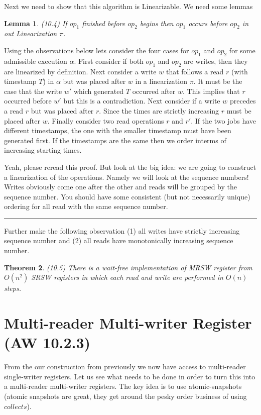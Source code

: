 \documentclass[twoside]{article}
\newcounter{lecnum}
\newtheorem{theorem}{Theorem}[lecnum]
\newtheorem{lemma}[theorem]{Lemma}
\newenvironment{proof}{{\bf Proof:}}{\hfill\rule{2mm}{2mm}}
\begin{document}
Next we need to show that this algorithm is Linearizable. We need some lemmas

\begin{lemma}
(10.4) If $op_1$ finished before $op_2$ begins then $op_1$ occurs before $op_2$ in out Linearization $\pi$. 
\end{lemma}
\begin{proof}
Using the observations below lets consider the four cases for $op_1$ and $op_2$ for some admissible execution $\alpha$. First consider if both $op_1$ and $op_2$ are writes, then they are linearized by definition. Next consider a write $w$ that follows a read $r$ (with timestamp $T$) in $\alpha$ but was placed after $w$ in a linearization $\pi$. It must be the case that the write $w'$ which generated $T$ occurred after $w$. This implies that $r$ occurred before $w'$ but this is a contradiction. Next consider if a write $w$ precedes a read $r$ but was placed after $r$. Since the times are strictly increasing $r$ must be placed after $w$. Finally consider two read operations $r$ and $r'$. If the two jobs have different timestamps, the one with the smaller timestamp must have been generated first. If the timestamps are the same then we order interms of increasing starting times. 

Yeah, please reread this proof. But look at the big idea: we are going to construct a linearization of the operations. Namely we will look at the sequence numbers! Writes obviously come one after the other and reads will be grouped by the sequence number. You should have some consistent (but not necessarily unique) ordering for all read with the same sequence number. 
\end{proof}

Further make the following observation (1) all writes have strictly increasing sequence number and (2) all reads have monotonically increasing sequence number. 

\begin{theorem}
(10.5) There is a wait-free implementation of MRSW register from $O(n^2)$ SRSW registers in which each read and write are performed in $O(n)$ steps. 
\end{theorem}

\section{Multi-reader Multi-writer Register (AW 10.2.3)}
From the our construction from previously we now have access to multi-reader single-writer registers. Let us see what needs to be done in order to turn this into a multi-reader multi-writer registers. The key idea is to use atomic-snapshots (atomic snapshots are great, they get around the pesky order business of using $collects$). 
\end{document}
